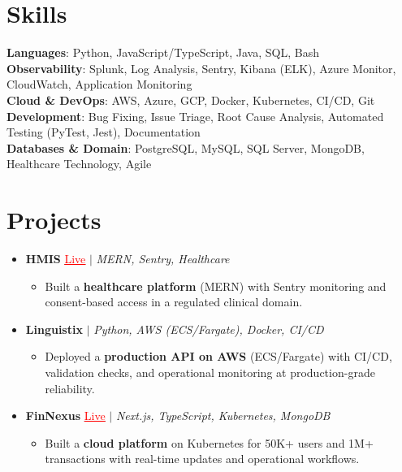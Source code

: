 \documentclass[letterpaper,10pt]{article}
\newcommand{\resumeItem}[1]{\item\small{{#1 \vspace{-2pt}}}}
\newcommand{\resumeProjectHeading}[1]{\item \small #1 \vspace{-2pt}}
\newcommand{\resumeSubHeadingListStart}{\begin{itemize}[leftmargin=0.0in, label={}]}
\newcommand{\resumeSubHeadingListEnd}{\end{itemize}}
\newcommand{\resumeProjItemListStart}{\begin{itemize}[leftmargin=0.15in,label=\textbullet,itemsep=0pt,topsep=0pt,parsep=0pt,partopsep=0pt]}
\newcommand{\resumeProjItemListEnd}{\end{itemize}\vspace{-4pt}}
\begin{document}
\section{Skills}
\begin{itemize}[leftmargin=0.15in, label={}]
\small{\item{
\textbf{Languages}: Python, JavaScript/TypeScript, Java, SQL, Bash \\
\textbf{Observability}: Splunk, Log Analysis, Sentry, Kibana (ELK), Azure Monitor, CloudWatch, Application Monitoring \\
\textbf{Cloud \& DevOps}: AWS, Azure, GCP, Docker, Kubernetes, CI/CD, Git \\
\textbf{Development}: Bug Fixing, Issue Triage, Root Cause Analysis, Automated Testing (PyTest, Jest), Documentation \\
\textbf{Databases \& Domain}: PostgreSQL, MySQL, SQL Server, MongoDB, Healthcare Technology, Agile
}}
\end{itemize}
\vspace{-6pt}
\section{Projects}
\resumeSubHeadingListStart
\vspace{-2pt}
\resumeProjectHeading{\textbf{HMIS} {\href{https://hims-rouge.vercel.app/}{\textcolor{red}{\underline{Live}}}} $|$ \emph{MERN, Sentry, Healthcare}}
\resumeProjItemListStart
\resumeItem{Built a \textbf{healthcare platform} (MERN) with Sentry monitoring and consent-based access in a regulated clinical domain.}
\resumeProjItemListEnd
\vspace{3pt}
\resumeProjectHeading{\textbf{Linguistix} $|$ \emph{Python, AWS (ECS/Fargate), Docker, CI/CD}}
\resumeProjItemListStart
\resumeItem{Deployed a \textbf{production API on AWS} (ECS/Fargate) with CI/CD, validation checks, and operational monitoring at production-grade reliability.}
\resumeProjItemListEnd
\vspace{3pt}
\resumeProjectHeading{\textbf{FinNexus} {\href{https://fin-nexus.vercel.app/}{\textcolor{red}{\underline{Live}}}} $|$ \emph{Next.js, TypeScript, Kubernetes, MongoDB}}
\resumeProjItemListStart
\resumeItem{Built a \textbf{cloud platform} on Kubernetes for 50K+ users and 1M+ transactions with real-time updates and operational workflows.}
\resumeProjItemListEnd
\resumeSubHeadingListEnd
\end{document}
